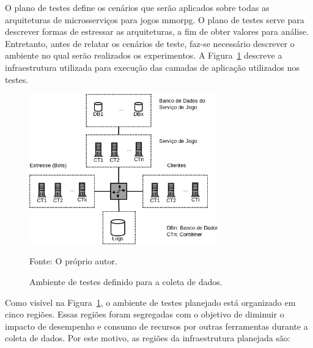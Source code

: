 O plano de testes define os cenários que serão aplicados sobre todas as arquiteturas de microsserviços para jogos \ac{mmorpg}.
%
O plano de testes serve para descrever formas de estressar as arquiteturas, a fim de obter valores para análise.
%
Entretanto, antes de relatar os cenários de teste, faz-se necessário descrever o ambiente no qual serão realizados os experimentos.
%
A Figura~\ref{Ambiente de testes} descreve a infraestrutura utilizada para execução das camadas de aplicação utilizados nos testes.



\begin{figure}[htb!]
  \caption{Ambiente de testes definido para a coleta de dados.}
  \label{Ambiente de testes}
  \includegraphics[height=6.5cm]{img/cap3/infraestrutura.png}
  \centering

  Fonte: O próprio autor.
\end{figure}



Como visível na Figura~\ref{Ambiente de testes}, o ambiente de testes planejado está organizado em cinco regiões.
%
Essas regiões foram segregadas com o objetivo de diminuir o impacto de desempenho e consumo de recursos por outras ferramentas durante a coleta de dados.
%
Por este motivo, as regiões da infraestrutura planejada são:



